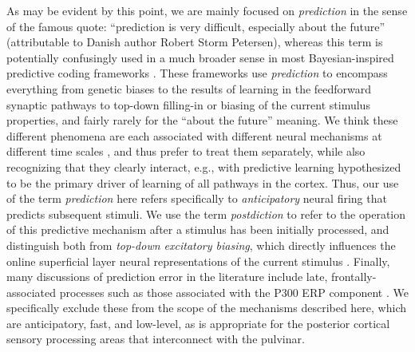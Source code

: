 \documentclass[11pt,twoside]{article}
\newif\myifpdf
\begin{document}
As may be evident by this point, we are mainly focused on \emph{prediction} in the sense of the famous quote: ``prediction is very difficult, especially about the future'' (attributable to Danish author Robert Storm Petersen), whereas this term is potentially confusingly used in a much broader sense in most Bayesian-inspired predictive coding frameworks \citep{RaoBallard99,Friston05,deLangeHeilbronKok18}.  These frameworks use \emph{prediction} to encompass everything from genetic biases to the results of learning in the feedforward synaptic pathways to top-down filling-in or biasing of the current stimulus properties, and fairly rarely for the  ``about the future'' meaning.  We think these different phenomena are each associated with different neural mechanisms at different time scales \citep{OReillyWyatteHerdEtAl13,OReillyMunakataFrankEtAl12}, and thus prefer to treat them separately, while also recognizing that they clearly interact, e.g., with predictive learning hypothesized to be the primary driver of learning of all pathways in the cortex.  Thus, our use of the term \emph{prediction} here refers specifically to \emph{anticipatory} neural firing that predicts subsequent stimuli.  We use the term \emph{postdiction} to refer to the operation of this predictive mechanism after a stimulus has been initially processed, and distinguish both from \emph{top-down excitatory biasing}, which directly influences the online superficial layer neural representations of the current stimulus \citep{DesimoneDuncan95,ReynoldsChelazziDesimone99,MillerCohen01,OReillyWyatteHerdEtAl13}.  Finally, many discussions of prediction error in the literature include late, frontally-associated processes such as those associated with the P300 ERP component \citep{P300}.  We specifically exclude these from the scope of the mechanisms described here, which are anticipatory, fast, and low-level, as is appropriate for the posterior cortical sensory processing areas that interconnect with the pulvinar.
\end{document}

